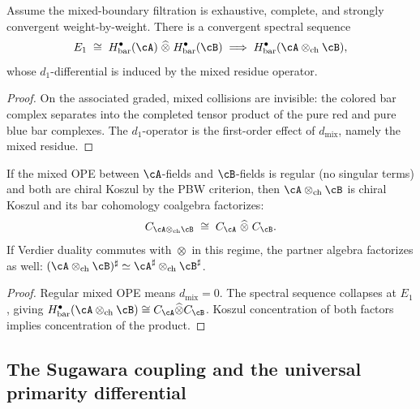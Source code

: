 \begin{theorem}
\label{thm:mixed-boundary-sseq}
Assume the mixed-boundary filtration is exhaustive, complete, and
strongly convergent weight-by-weight. There is a convergent
spectral sequence
\[
E_1
\;\cong\;
H^\bullet_{\mathrm{bar}}(\cA)
 \;\widehat{\otimes}\;
H^\bullet_{\mathrm{bar}}(\cB)
\;\Longrightarrow\;
H^\bullet_{\mathrm{bar}}(\cA \otimes_{\mathrm{ch}} \cB),
\]
whose $d_1$-differential is induced by the mixed residue operator.
\end{theorem}

\begin{proof}
On the associated graded, mixed collisions are invisible: the colored
bar complex separates into the completed tensor product of the pure
red and pure blue bar complexes. The $d_1$-operator is the
first-order effect of $d_{\mathrm{mix}}$, namely the mixed residue.
\end{proof}

\begin{theorem}
\label{thm:pbw-regular-tensor}
If the mixed OPE between $\cA$-fields and $\cB$-fields is regular
\textup{(}no singular terms\textup{)} and both are chiral Koszul by
the PBW criterion, then $\cA \otimes_{\mathrm{ch}} \cB$ is chiral
Koszul and its bar cohomology coalgebra factorizes:
\[
C_{\cA \otimes_{\mathrm{ch}} \cB}
\;\cong\;
C_\cA \;\widehat{\otimes}\; C_\cB.
\]
If Verdier duality commutes with $\widehat{\otimes}$ in this regime,
the partner algebra factorizes as well:
$(\cA \otimes_{\mathrm{ch}} \cB)^\sharp
\simeq \cA^\sharp \otimes_{\mathrm{ch}} \cB^\sharp$.
\end{theorem}

\begin{proof}
Regular mixed OPE means $d_{\mathrm{mix}} = 0$. The spectral
sequence collapses at $E_1$, giving
$H^\bullet_{\mathrm{bar}}(\cA \otimes_{\mathrm{ch}} \cB)
\cong C_\cA \widehat{\otimes} C_\cB$. Koszul concentration
of both factors implies concentration of the product.
\end{proof}

\subsection{The Sugawara coupling and the universal primarity differential}
\label{subsec:sugawara-coupling}


